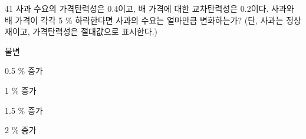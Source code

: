 \begin{question}{41}
사과 수요의 가격탄력성은 0.4이고, 배 가격에 대한 교차탄력성은 0.2이다. 사과와 배 가격이 각각 5 \% 하락한다면 사과의 수요는 얼마만큼 변화하는가? (단, 사과는 정상재이고, 가격탄력성은 절대값으로 표시한다.)
\begin{choices}
  \item 불변
  \item 0.5 \% 증가
  \item 1 \% 증가
  \item 1.5 \% 증가
  \item 2 \% 증가
\end{choices}
\end{question}
